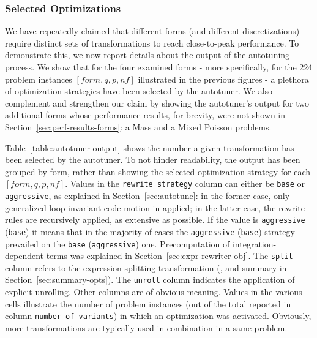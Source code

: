 \subsubsection{Selected Optimizations}
We have repeatedly claimed that different forms (and different discretizations) require distinct sets of transformations to reach close-to-peak performance. To demonstrate this, we now report details about the output of the autotuning process. We show that for the four examined forms - more specifically, for the 224 problem instances $[form, q, p, nf]$ illustrated in the previous figures - a plethora of optimization strategies have been selected by the autotuner. We also complement and strengthen our claim by showing the autotuner's output for two additional forms whose performance results, for brevity, were not shown in Section~\ref{sec:perf-results-forms}: a Mass and a Mixed Poisson problems. 

Table~\ref{table:autotuner-output} shows the number a given transformation has been selected by the autotuner. To not hinder readability, the output has been grouped by form, rather than showing the selected optimization strategy for each $[form, q, p, nf]$. Values in the \texttt{rewrite strategy} column can either be \texttt{base} or \texttt{aggressive}, as explained in Section~\ref{sec:autotune}: in the former case, only generalized loop-invariant code motion in applied; in the latter case, the rewrite rules are recursively applied, as extensive as possible. If the value is \texttt{aggressive} (\texttt{base}) it means that in the majority of cases the \texttt{aggressive} (\texttt{base}) strategy prevailed on the \texttt{base} (\texttt{aggressive}) one. Precomputation of integration-dependent terms was explained in Section~\ref{sec:expr-rewriter-obj}. The \texttt{split} column refers to the expression splitting transformation (\cite{Luporini}, and summary in Section~\ref{sec:summary-opts}). The \texttt{unroll} column indicates the application of explicit unrolling. Other columns are of obvious meaning. Values in the various cells illustrate the number of problem instances (out of the total reported in column \texttt{number of variants}) in which an optimization was activated. Obviously, more transformations are typically used in combination in a same problem. 


